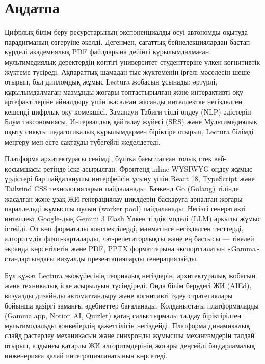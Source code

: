\chapter*{Аңдатпа}
\begin{SingleSpace}
Цифрлық білім беру ресурстарының экспоненциалды өсуі автономды оқытуда парадигманың өзгеруіне әкелді. Дегенмен, сағаттық бейнелекциялардан бастап күрделі академиялық PDF файлдарына дейінгі құрылымдалмаған мультимедиялық деректердің көптігі университет студенттеріне үлкен когнитивтік жүктеме түсіреді. Ақпараттық шамадан тыс жүктеменің іргелі мәселесін шеше отырып, бұл дипломдық жұмыс Lectura жобасын ұсынады: әртүрлі, құрылымдалмаған мазмұнды жоғары топтастырылған және интерактивті оқу артефактілеріне айналдыру үшін жасалған жасанды интеллектке негізделген кешенді цифрлық оқу көмекшісі. Заманауи Табиғи тілді өңдеу (NLP) әдістерін Блум таксономиясы, Интервалдық қайталау жүйесі (SRS) және Мультимедиялық оқыту сияқты педагогикалық құрылымдармен біріктіре отырып, Lectura білімді меңгеру мен есте сақтауды түбегейлі жеделдетеді.

Платформа архитектурасы сенімді, бұлтқа бағытталған толық стек веб-қосымшасы ретінде іске асырылған. Фронтенд inline WYSIWYG өңдеу жұмыс үрдістері бар пайдаланушы интерфейсін ұсыну үшін React 18, TypeScript және Tailwind CSS технологияларын пайдаланады. Баэкенд Go (Golang) тілінде жасалған және ұзақ ЖИ генерациялау циклдерін басқаруға арналған жоғары параллельді жұмысшы пулын (worker pool) пайдаланады. Негізгі генеративті интеллект Google-дың Gemini 3 Flash Үлкен тілдік моделі (LLM) арқылы жұмыс істейді. Ол көп форматалы конспектілерді, мәнмәтінге негізделген тесттерді, алгоритмдік флэш-карталарды, чат-репетиторлықты және ең бастысы — тікелей экранда көрсетілетін және PDF, PPTX форматтарына экспортталатын «Gamma» стандартындағы визуалды презентацияларды генерациялайды.

Бұл құжат Lectura экожүйесінің теориялық негіздерін, архитектуралық жобасын және техникалық іске асырылуын түсіндіреді. Онда білім берудегі ЖИ (AIEd), визуалды дизайнды автоматтандыру және когнитивті іздеу стратегиялары бойынша қазіргі заманғы әдебиеттер бағаланады. Қолданыстағы платформаларды (Gamma.app, Notion AI, Quizlet) қатаң салыстырмалы талдау біріктірілген мультимодальды конвейердің қажеттілігін негіздейді. Платформа динамикалық слайд растерлеу механикасын және синхронды жұмысшы механизмдерін талдай отырып, алдыңғы қатарлы ЖИ алгоритмдерінің жоғары деңгейлі бағдарламалық инженерияға қалай интеграцияланатынын көрсетеді.
\end{SingleSpace}

